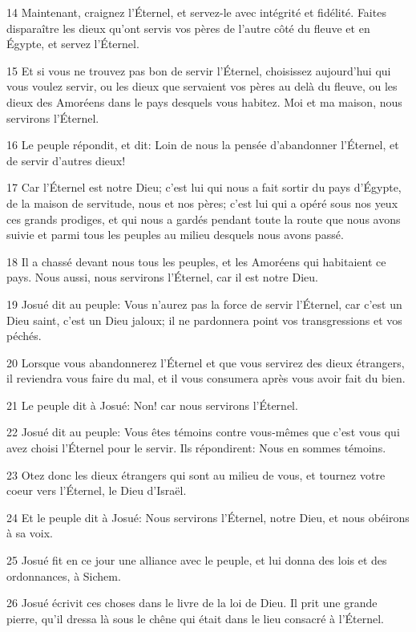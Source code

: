 \par 14 Maintenant, craignez l'Éternel, et servez-le avec intégrité et fidélité. Faites disparaître les dieux qu'ont servis vos pères de l'autre côté du fleuve et en Égypte, et servez l'Éternel.
\par 15 Et si vous ne trouvez pas bon de servir l'Éternel, choisissez aujourd'hui qui vous voulez servir, ou les dieux que servaient vos pères au delà du fleuve, ou les dieux des Amoréens dans le pays desquels vous habitez. Moi et ma maison, nous servirons l'Éternel.
\par 16 Le peuple répondit, et dit: Loin de nous la pensée d'abandonner l'Éternel, et de servir d'autres dieux!
\par 17 Car l'Éternel est notre Dieu; c'est lui qui nous a fait sortir du pays d'Égypte, de la maison de servitude, nous et nos pères; c'est lui qui a opéré sous nos yeux ces grands prodiges, et qui nous a gardés pendant toute la route que nous avons suivie et parmi tous les peuples au milieu desquels nous avons passé.
\par 18 Il a chassé devant nous tous les peuples, et les Amoréens qui habitaient ce pays. Nous aussi, nous servirons l'Éternel, car il est notre Dieu.
\par 19 Josué dit au peuple: Vous n'aurez pas la force de servir l'Éternel, car c'est un Dieu saint, c'est un Dieu jaloux; il ne pardonnera point vos transgressions et vos péchés.
\par 20 Lorsque vous abandonnerez l'Éternel et que vous servirez des dieux étrangers, il reviendra vous faire du mal, et il vous consumera après vous avoir fait du bien.
\par 21 Le peuple dit à Josué: Non! car nous servirons l'Éternel.
\par 22 Josué dit au peuple: Vous êtes témoins contre vous-mêmes que c'est vous qui avez choisi l'Éternel pour le servir. Ils répondirent: Nous en sommes témoins.
\par 23 Otez donc les dieux étrangers qui sont au milieu de vous, et tournez votre coeur vers l'Éternel, le Dieu d'Israël.
\par 24 Et le peuple dit à Josué: Nous servirons l'Éternel, notre Dieu, et nous obéirons à sa voix.
\par 25 Josué fit en ce jour une alliance avec le peuple, et lui donna des lois et des ordonnances, à Sichem.
\par 26 Josué écrivit ces choses dans le livre de la loi de Dieu. Il prit une grande pierre, qu'il dressa là sous le chêne qui était dans le lieu consacré à l'Éternel.
